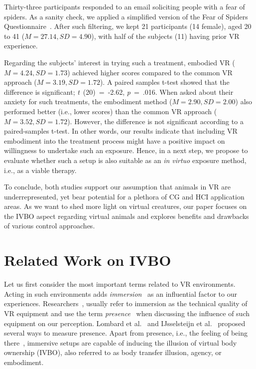Thirty-three participants responded to an email soliciting people with a fear of spiders. As a sanity check, we applied a simplified version of the Fear of Spiders Questionnaire~\cite{szymanski1995fear}. After such filtering, we kept 21 participants (14 female), aged 20 to 41 ($M = 27.14, SD = 4.90$), with half of the subjects (11) having prior VR experience.

Regarding the subjects' interest in trying such a treatment, embodied VR ($M = 4.24, SD = 1.73$) achieved higher scores compared to the common VR approach ($M = 3.19, SD = 1.72$). A paired samples t-test showed that the difference is significant; \textit{t}~(20)~=~-2.62, \textit{p}~=~.016. When asked about their anxiety for such treatments, the embodiment method ($M = 2.90, SD = 2.00$) also performed better (i.e., lower scores) than the common VR approach ($M = 3.52, SD = 1.72$). However, the difference is not significant according to a paired-samples t-test. In other words, our results indicate that including VR embodiment into the treatment process might have a positive impact on willingness to undertake such an exposure. Hence, in a next step, we propose to evaluate whether such a setup is also suitable as an \textit{in virtuo} exposure method, i.e., as a viable therapy.

To conclude, both studies support our assumption that animals in VR are underrepresented, yet bear potential for a plethora of CG and HCI application areas. As we want to shed more light on virtual creatures, our paper focuses on the IVBO aspect regarding virtual animals and explores benefits and drawbacks of various control approaches.


\section{Related Work on IVBO}

Let us first consider the most important terms related to VR environments. Acting in such environments adds \textit{immersion}~\cite{cairns2014immersion} as an influential factor to our experiences. Researchers~\cite{Biocca:1995:IVR:207922.207926,sherman2002understanding}, usually refer to immersion as the technical quality of VR equipment and use the term \textit{presence}~\cite{slater1995taking, slater2003note} when discussing the influence of such equipment on our perception. Lombard et al.~ and IJsselsteijn et al.~ proposed several ways to measure presence. Apart from presence, i.e., the feeling of being there~\cite{heeter1992being}, immersive setups are capable of inducing the illusion of virtual body ownership (IVBO), also referred to as body transfer illusion, agency, or embodiment.


